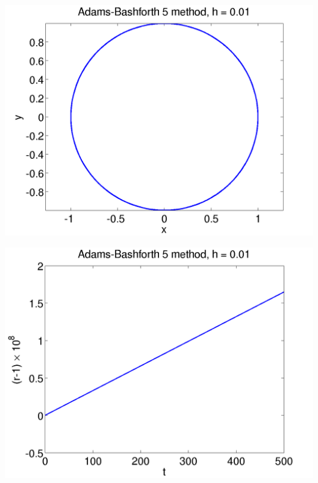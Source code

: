 \documentclass{beamer}
\begin{document}
\begin{frame}
\begin{columns}
\begin{column}{0.5\textwidth}
\begin{overlayarea}{\textwidth}{0.6\textheight}
{\begin{center}
          \end{center}
        }
        {
          \begin{center}
            \includegraphics[height=0.5\textheight]{figures/AB5_2}
          \end{center}
        }
        {
          \begin{center}
            \includegraphics[height=0.5\textheight]{figures/AB5_rad2}
          \end{center}
        }
      \end{overlayarea}
    \end{column}
  \end{columns}

\end{frame}
\end{document}

